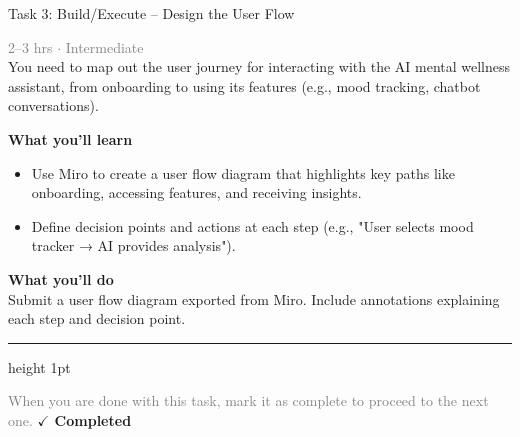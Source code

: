 \documentclass[10pt,a4paper]{article}
\begin{document}
\begin{taskbox}{Task 3: Build/Execute – Design the User Flow}

    {\small \textcolor{gray}{2--3 hrs $\cdot$ Intermediate}}\\[12pt]

      
You need to map out the user journey for interacting with the AI mental wellness assistant, from onboarding to using its features (e.g., mood tracking, chatbot conversations).


\vspace{8pt}
{\large \textbf{\textcolor{brandLight}{What you'll learn}}}\\[4pt]  
\begin{itemize}
    \item Use Miro to create a user flow diagram that highlights key paths like onboarding, accessing features, and receiving insights.  
    \item Define decision points and actions at each step (e.g., "User selects mood tracker → AI provides analysis").
\end{itemize}

\vspace{8pt}
{\large \textbf{\textcolor{brandLight}{What you'll do}}}\\[4pt]  
Submit a user flow diagram exported from Miro. Include annotations explaining each step and decision point.\par

    \vspace{16pt}

    \textcolor{cardBorder}{\hrule height 1pt}\vspace{8pt}

    \small \textcolor{gray}{When you are done with this task, mark it as complete to proceed to the next one.} \hfill \textbf{\textcolor{brandDark}{$\checkmark$ Completed}}

\end{taskbox}
\end{document}
